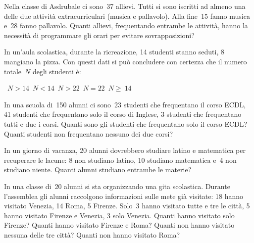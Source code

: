 \begin{esercizio}
\label{ese:5.87}
Nella classe di Asdrubale ci sono~37 allievi. Tutti si sono iscritti
ad almeno una delle due attività extracurriculari (musica e
pallavolo). Alla fine~15 fanno musica e~28 fanno pallavolo.
Quanti allievi, frequentando entrambe le attività, hanno la
necessità di programmare gli orari per evitare sovrapposizioni?
\begin{center}
 \boxA{}\quad\boxB{}\quad\boxC{}\quad\boxD{}\quad\boxE{}
\end{center}
\end{esercizio}
\pagebreak
\begin{esercizio}
\label{ese:5.88}
In un'aula scolastica, durante la ricreazione, 14
studenti stanno seduti, 8 mangiano la pizza. Con questi dati si può
concludere con certezza che il numero totale~$N$ degli studenti è:
\begin{center}
 \boxA\quad~$N>14$\quad\boxB\quad~$N<14$\quad\boxC\quad~$N>22$\quad\boxD\quad~$N = 22$\quad\boxE\quad~$N\ge~14$
\end{center}
\end{esercizio}

\begin{esercizio}
\label{ese:5.89}
In una scuola di~150 alunni ci sono~23 studenti che frequentano il corso ECDL, 41 studenti che frequentano solo il corso di Inglese, 3
studenti che frequentano tutti e due i corsi. Quanti sono gli studenti che frequentano solo il corso ECDL? Quanti studenti non frequentano
nessuno dei due corsi?
\end{esercizio}

\begin{esercizio}
\label{ese:5.90}
In un giorno di vacanza, 20 alunni dovrebbero studiare latino e
matematica per recuperare le lacune: 8 non studiano latino, 10 studiano
matematica e~4 non studiano niente. Quanti alunni studiano entrambe le
materie?
\end{esercizio}

\begin{esercizio}
\label{ese:5.91}
In una classe di~20 alunni si sta organizzando una gita
scolastica. Durante l'assemblea gli alunni raccolgono
informazioni sulle mete già visitate: 18 hanno visitato Venezia, 14
Roma, 5 Firenze. Solo~3 hanno visitato tutte e tre le città, 5 hanno
visitato Firenze e Venezia, 3 solo Venezia. Quanti hanno visitato solo
Firenze? Quanti hanno visitato Firenze e Roma? Quanti non hanno
visitato nessuna delle tre città? Quanti non hanno visitato Roma?
\end{esercizio}
